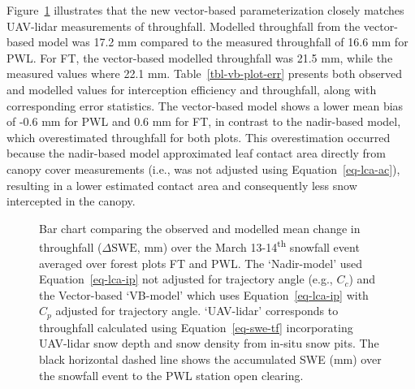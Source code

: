 \documentclass[
  letterpaper,
  DIV=11,
  numbers=noendperiod]{scrartcl}
\begin{document}
Figure~\ref{fig-event-tf} illustrates that the new vector-based
parameterization closely matches UAV-lidar measurements of throughfall.
Modelled throughfall from the vector-based model was 17.2 mm compared to
the measured throughfall of 16.6 mm for PWL. For FT, the vector-based
modelled throughfall was 21.5 mm, while the measured values where 22.1
mm. Table~\ref{tbl-vb-plot-err} presents both observed and modelled
values for interception efficiency and throughfall, along with
corresponding error statistics. The vector-based model shows a lower
mean bias of -0.6 mm for PWL and 0.6 mm for FT, in contrast to the
nadir-based model, which overestimated throughfall for both plots. This
overestimation occurred because the nadir-based model approximated leaf
contact area directly from canopy cover measurements (i.e., was not
adjusted using Equation~\ref{eq-lca-ac}), resulting in a lower estimated
contact area and consequently less snow intercepted in the canopy.

\begin{figure}[H]


\caption{\label{fig-event-tf}Bar chart comparing the observed and
modelled mean change in throughfall (\(\Delta \text{SWE}\), mm) over the
March 13-14\textsuperscript{th} snowfall event averaged over forest
plots FT and PWL. The `Nadir-model' used Equation~\ref{eq-lca-ip} not
adjusted for trajectory angle (e.g., \(C_c\)) and the Vector-based
`VB-model' which uses Equation~\ref{eq-lca-ip} with \(C_p\) adjusted for
trajectory angle. `UAV-lidar' corresponds to throughfall calculated
using Equation~\ref{eq-swe-tf} incorporating UAV-lidar snow depth and
snow density from in-situ snow pits. The black horizontal dashed line
shows the accumulated SWE (mm) over the snowfall event to the PWL
station open clearing.}

\end{figure}%
\end{document}
